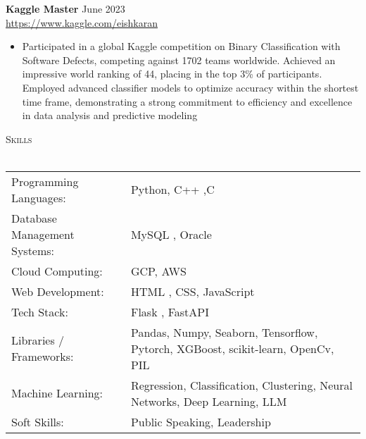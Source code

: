 \documentclass[a4paper]{article}
\newcommand{\lineunder} {
    \vspace*{-8pt} \\
    \hspace*{-18pt} \hrulefill \\
}
\newcommand{\header} [1] {
    {\hspace*{-18pt}\vspace*{6pt} \textsc{#1}}
    \vspace*{-6pt} \lineunder
}
\begin{document}
\vspace{-2.5mm}
{\textbf{Kaggle Master}} \hfill June 2023 \\
\vspace{-1mm}
\url{https://www.kaggle.com/eishkaran} \\
\vspace{-1.5mm}
\begin{itemize} 
    \vspace{-1mm}
    \item Participated in a global Kaggle competition on Binary Classification with Software Defects, competing against 1702 teams worldwide. Achieved an impressive world ranking of 44, placing in the top 3\% of participants. Employed advanced classifier models to optimize accuracy within the shortest time frame, demonstrating a strong commitment to efficiency and excellence in data analysis and predictive modeling
\vspace{-2.5mm}
\end{itemize}
\vspace{-2mm}
\header{Skills}
\vspace{0.5mm}
\begin{tabular}{ l l }
	Programming Languages: & Python, C++ ,C  \\
	Database Management Systems: & MySQL , Oracle \\ 
    Cloud Computing: & GCP, AWS\\
	Web Development:       & HTML , CSS, JavaScript   \\
    Tech Stack:       & Flask , FastAPI   \\
	Libraries / Frameworks: & Pandas, Numpy, Seaborn, Tensorflow, Pytorch, XGBoost, scikit-learn, OpenCv, PIL       \\
	Machine Learning:             & Regression, Classification, Clustering, Neural Networks, Deep Learning, LLM\\
	Soft Skills:           &  Public Speaking, Leadership  \\
	
\end{tabular}


\end{document}
